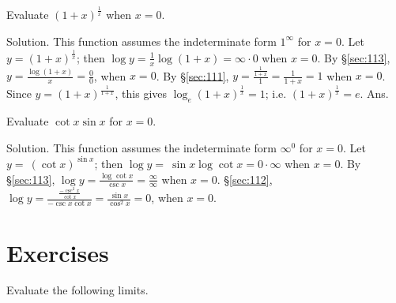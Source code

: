 \begin{example}
Evaluate $(1 + x)^{\frac{1}{x}}$ when $x = 0$.

Solution. This function assumes the indeterminate form $1^{\infty}$ for $x = 0$.
Let $y 	= (1 + x)^{\frac{1}{x}}$;
then $\log y 	= \frac{1}{x} \log(1 + x) = \infty \cdot 0$
when $x = 0$. By \S \ref{sec:113},
$ y 	= \frac{\log(1 + x)}{x} = \frac{0}{0}$, when $x = 0$.
By \S \ref{sec:111}, 
$ y 	= \frac{\frac{1}{1 + x}}{1} = \frac{1}{1 + x} = 1$
when $x = 0$.
Since $y = (1 + x)^{\frac{1}{1 + x}}$, this gives $\log_e (1 + x)^{\frac{1}{x}} = 1$; 
i.e. $(1 + x)^{\frac{1}{x}} = e$. Ans.
\end{example}

\begin{example}
Evaluate $\cot x\sin x$ for $x = 0$.

Solution. This function assumes the indeterminate form $\infty^0$ for $x = 0$.
Let $ y 	=\ (\cot x)^{\sin x}$;
then $ \log y 	=\ \sin x \log \cot x = 0 \cdot \infty$ when $x = 0$.
By \S \ref{sec:113},
$ \log y 	= \frac{\log \cot x}{\csc x} = \frac{\infty}{\infty}$
when $x = 0$.
\S \ref{sec:112},
$ \log y 	= \frac{\frac{-\csc^2 x}{\cot x}}{-\csc x \cot x} 
= \frac{\sin x}{\cos^2 x} = 0$,	when $x = 0$.
\end{example}



\section{Exercises}
Evaluate the following limits.

